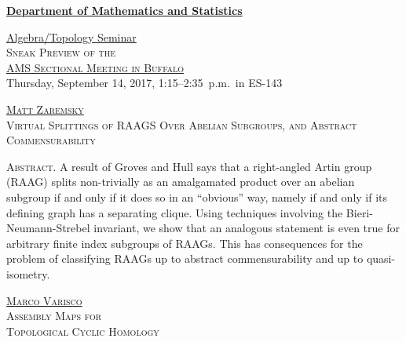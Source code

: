 \documentclass[12pt]{article}
\begin{document}
\thispagestyle{empty}

\noindent\hspace{-28pt}\raisebox{-19pt}{\XeTeXpicfile UAlogo.jpg scaled 340}%
\hfill\textsf{\textbf{\footnotesize\href{http://www.albany.edu/math/}{Department of Mathematics and Statistics}}}\bigskip

\begin{center}\Large
  \textsf{\huge \href{http://www.albany.edu/~mv312143/seminar/}{Algebra/Topology Seminar}}\\[2.5\bigskipamount]
  \textsc{\LARGE Sneak Preview of the\\ \href{http://www.ams.org/meetings/sectional/2240_program.html}{AMS Sectional Meeting in Buffalo}}\\[1.5\bigskipamount]
  Thursday, September 14, 2017, 1:15--2:35~p.m.\ in ES-143\\[1.5\bigskipamount]
\end{center}
\noindent\hrulefill\bigskip

\begin{center}\Large
  \textsc{\LARGE\href{http://www.albany.edu/~mz498674/}{Matt Zaremsky}}\\[\bigskipamount]
  \textsc{\LARGE Virtual Splittings of RAAGS Over Abelian Subgroups, and Abstract Commensurability}\\[1.5\bigskipamount]
\end{center}

\noindent\small\textsc{Abstract.}
A result of Groves and Hull says that a right-angled Artin group (RAAG) splits non-trivially as an amalgamated product over an abelian subgroup if and only if it does so in an ``obvious'' way, namely if and only if its defining graph has a separating clique. Using techniques involving the Bieri-Neumann-Strebel invariant, we show that an analogous statement is even true for arbitrary finite index subgroups of RAAGs. This has consequences for the problem of classifying RAAGs up to abstract commensurability and up to quasi-isometry.
\bigskip

\noindent\hrulefill\bigskip
\begin{center}\Large
  \textsc{\LARGE\href{http://www.albany.edu/~mv312143/}{Marco Varisco}}\\[\bigskipamount]
  \textsc{\LARGE Assembly Maps for\\ Topological Cyclic Homology}\\[1.5\bigskipamount]
\end{center}
\end{document}
